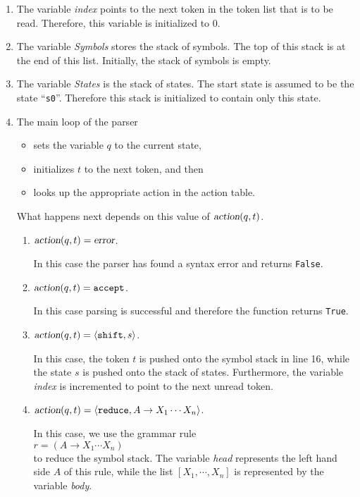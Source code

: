 \begin{enumerate}
\item The variable \textsl{index} points to the next token in the token list that is to be
      read.  Therefore, this variable is initialized to 0.
\item The variable \textsl{Symbols} stores the stack of symbols.  The top of this stack is
      at the end of this list.  Initially, the stack of symbols is empty.
\item The variable \textsl{States} is the stack of states.  The start state is assumed to
      be the state ``\texttt{s0}''.  Therefore this stack is initialized to contain
      only this state.
\item The main loop of the parser 
      \begin{itemize}
      \item sets the variable $q$ to the current state,
      \item initializes $t$ to the next token, and then
      \item looks up the appropriate action in the action table.
      \end{itemize}
      What happens next depends on this value of $\textsl{action}(q, t)$.
      \begin{enumerate}
      \item $\textsl{action}(q,t) = \textsl{error}$.

            In this case the parser has found a syntax error and returns \texttt{False}.
      \item $\textsl{action}(q,t) = \texttt{accept}$.

            In this case parsing is successful and therefore the function returns \texttt{True}.
      \item $\textsl{action}(q,t) = \pair(\texttt{shift}, s)$.
        
            In this case, the token $t$ is pushed onto the symbol stack in line 16,
            while the state $s$ is pushed onto the stack of states.  Furthermore,
            the variable \textsl{index} is incremented to point to the next unread token.            
      \item $\textsl{action}(q,t) = \pair(\texttt{reduce}, A \rightarrow X_1 \cdots X_n)$.

            In this case, we use the grammar rule
            \\[0.2cm]
            \hspace*{1.3cm}
            $r = (A \rightarrow X_1 \cdots X_n)$
            \\[0.2cm]
            to reduce the symbol stack.  The  variable \textsl{head} represents the left
            hand side $A$ of this rule, while the list $[X_1, \cdots,X_n]$ is represented
            by the variable \textsl{body}.


\end{enumerate}
\end{enumerate}
